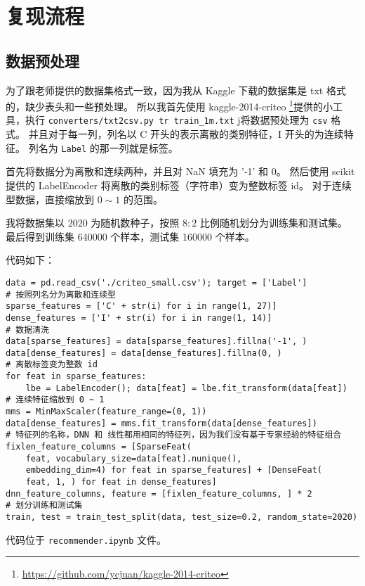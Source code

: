\documentclass[degree=master,cjk-font=noto]{thuthesis}
\begin{document}
\chapter{复现流程}

\section{数据预处理}

为了跟老师提供的数据集格式一致，因为我从 Kaggle 下载的数据集是 txt 格式的，缺少表头和一些预处理。
所以我首先使用 kaggle-2014-criteo \footnote{\url{https://github.com/ycjuan/kaggle-2014-criteo}}提供的小工具，执行 \texttt{converters/txt2csv.py tr train\_1m.txt} j将数据预处理为 \texttt{csv} 格式。
并且对于每一列，列名以 C 开头的表示离散的类别特征，I 开头的为连续特征。
列名为 \texttt{Label} 的那一列就是标签。

首先将数据分为离散和连续两种，并且对 NaN 填充为 '-1' 和 0。
然后使用 scikit 提供的 LabelEncoder 将离散的类别标签（字符串）变为整数标签 id。
对于连续型数据，直接缩放到 $0 \sim 1$ 的范围。

我将数据集以 2020 为随机数种子，按照 $8 : 2$ 比例随机划分为训练集和测试集。
最后得到训练集 640000 个样本，测试集 160000 个样本。

代码如下：

  \begin{verbatim}
data = pd.read_csv('./criteo_small.csv'); target = ['Label']
# 按照列名分为离散和连续型
sparse_features = ['C' + str(i) for i in range(1, 27)]
dense_features = ['I' + str(i) for i in range(1, 14)]
# 数据清洗
data[sparse_features] = data[sparse_features].fillna('-1', )
data[dense_features] = data[dense_features].fillna(0, )
# 离散标签变为整数 id
for feat in sparse_features:
    lbe = LabelEncoder(); data[feat] = lbe.fit_transform(data[feat])
# 连续特征缩放到 0 ~ 1
mms = MinMaxScaler(feature_range=(0, 1))
data[dense_features] = mms.fit_transform(data[dense_features])
# 特征列的名称，DNN 和 线性都用相同的特征列，因为我们没有基于专家经验的特征组合
fixlen_feature_columns = [SparseFeat(
    feat, vocabulary_size=data[feat].nunique(),
    embedding_dim=4) for feat in sparse_features] + [DenseFeat(
    feat, 1, ) for feat in dense_features]
dnn_feature_columns, feature = [fixlen_feature_columns, ] * 2
# 划分训练和测试集
train, test = train_test_split(data, test_size=0.2, random_state=2020)
  \end{verbatim}

代码位于 \texttt{recommender.ipynb} 文件。
\end{document}
